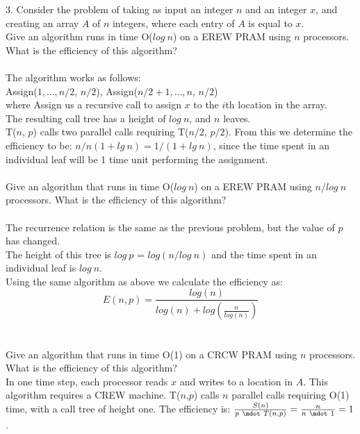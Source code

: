 \documentclass[10pt]{article}
\begin{document}
3. Consider the problem of taking as input an integer $n$ and an integer $x$, and creating an array $A$ of $n$
integers, where each entry of $A$ is equal to $x$.\\

Give an algorithm runs in time O($log~n$) on a EREW PRAM using $n$ processors. What is the
efficiency of this algorithm?\\
\\
The algorithm works as follows:\\
Assign($1, \ldots, n/2$, $n/2$), Assign($n/2 + 1, \ldots, n$, $n/2$)\\ 
where Assign us a recursive call to assign $x$ to the $i$th location in the array.\\
The resulting call tree has a height of $log~n$, and $n$ leaves.\\
T($n$, $p$) calls two parallel calls requiring T($n/2$, $p/2$). From this we 
determine the efficiency to be: $n/n(1 + lg~n) =  1/(1+ lg~n)$, since the time spent in an 
individual leaf will be 1 time unit performing the assignment.\\ 
\\
Give an algorithm that runs in time O($log~n$) on a EREW PRAM using $n/log~n$ processors. What
is the efficiency of this algorithm?\\
\\
The recurrence relation is the same as the previous problem, but the value of $p$ has changed.\\
The height of this tree is $log~p$ = $log(n/log~n)$ and the time spent in an individual leaf is $log~n$.\\ 
Using the same algorithm as above we calculate the efficiency as:\\
	\[
	E(n,p) = \frac{log(n)}{log(n)+log(\frac{n}{log(n)})}
\]
\\
\\
Give an algorithm that runs in time O(1) on a CRCW PRAM using $n$ processors. What is the
efficiency of this algorithm?\\
In one time step, each processor reads $x$ and writes to a location in $A$. This algorithm requires
a CREW machine. T($n$,$p$) calls $n$ parallel calls requiring O(1) time, with a call tree of height one.
The efficiency is: $\frac{S(n)}{p~\mdot~T(n,p)} = \frac{n}{n~\mdot~1} = 1$.
\\
\end{document}
